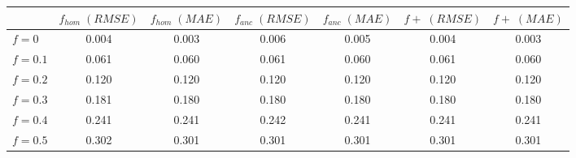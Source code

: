 \begin{tabular}{lcccccc}
\toprule
 & $f_{hom}\;(RMSE)$ & $f_{hom}\;(MAE)$ & $f_{anc}\;(RMSE)$ & $f_{anc}\;(MAE)$ & $f+\;(RMSE)$ & $f+\;(MAE)$ \\
\midrule
$f = 0$ & 0.004 & 0.003 & 0.006 & 0.005 & 0.004 & 0.003 \\
$f = 0.1$ & 0.061 & 0.060 & 0.061 & 0.060 & 0.061 & 0.060 \\
$f = 0.2$ & 0.120 & 0.120 & 0.120 & 0.120 & 0.120 & 0.120 \\
$f = 0.3$ & 0.181 & 0.180 & 0.180 & 0.180 & 0.180 & 0.180 \\
$f = 0.4$ & 0.241 & 0.241 & 0.242 & 0.241 & 0.241 & 0.241 \\
$f = 0.5$ & 0.302 & 0.301 & 0.301 & 0.301 & 0.301 & 0.301 \\
\bottomrule
\end{tabular}
